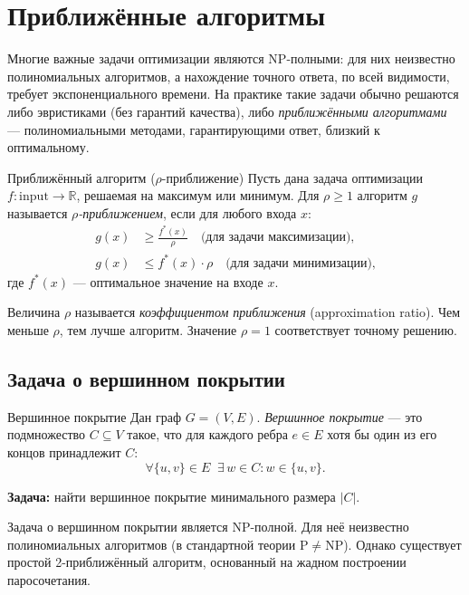 
\section{Приближённые алгоритмы}

Многие важные задачи оптимизации являются NP-полными: для них неизвестно полиномиальных алгоритмов, а нахождение точного ответа, по всей видимости, требует экспоненциального времени. На практике такие задачи обычно решаются либо эвристиками (без гарантий качества), либо \emph{приближёнными алгоритмами} — полиномиальными методами, гарантирующими ответ, близкий к оптимальному.

\begin{Definition}{Приближённый алгоритм ($\rho$-приближение)}{}
	Пусть дана задача оптимизации $f\colon \mathrm{input} \to \mathbb{R}$, решаемая на максимум или минимум. Для $\rho \geq 1$ алгоритм $g$ называется \emph{$\rho$-приближением}, если для любого входа $x$:
	\begin{align*}
		g(x) &\geq \frac{f^*(x)}{\rho} \quad \text{(для задачи максимизации),} \\
		g(x) &\leq f^*(x) \cdot \rho \quad \text{(для задачи минимизации),}
	\end{align*}
	где $f^*(x)$ — оптимальное значение на входе $x$.
\end{Definition}

\begin{Remark}{}{}
	Величина $\rho$ называется \emph{коэффициентом приближения} (approximation ratio). Чем меньше $\rho$, тем лучше алгоритм. Значение $\rho = 1$ соответствует точному решению.
\end{Remark}

\subsection{Задача о вершинном покрытии}

\begin{Definition}{Вершинное покрытие}{}
	Дан граф $G = (V, E)$. \emph{Вершинное покрытие} — это подмножество $C \subseteq V$ такое, что для каждого ребра $e \in E$ хотя бы один из его концов принадлежит $C$:
	\[
	\forall \{u,v\} \in E \;\; \exists\, w \in C \colon w \in \{u,v\}.
	\]
\end{Definition}

\textbf{Задача:} найти вершинное покрытие минимального размера $|C|$.

Задача о вершинном покрытии является NP-полной. Для неё неизвестно полиномиальных алгоритмов (в стандартной теории $\mathrm{P} \neq \mathrm{NP}$). Однако существует простой 2-приближённый алгоритм, основанный на жадном построении паросочетания.

